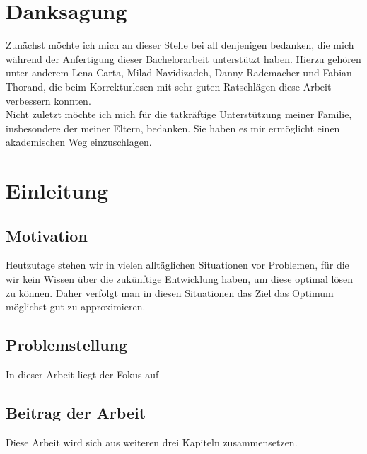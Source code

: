 \documentclass[12pt,twoside]{report}
\begin{document}
	
	\pagestyle{empty}
	\clearpage\mbox{}\clearpage
	\chapter*{Danksagung}
	Zunächst möchte ich mich an dieser Stelle bei all denjenigen bedanken, die mich während der Anfertigung dieser Bachelorarbeit unterstützt haben. Hierzu gehören unter anderem Lena Carta, Milad Navidizadeh, Danny Rademacher und Fabian Thorand, die beim Korrekturlesen mit sehr guten Ratschlägen diese Arbeit verbessern konnten.\\
	
	Nicht zuletzt möchte ich mich für die tatkräftige Unterstützung meiner Familie, insbesondere der meiner Eltern, bedanken. Sie haben es mir ermöglicht einen akademischen Weg einzuschlagen.
	
	\pagestyle{empty}
	\clearpage\mbox{}\clearpage	
	
	\tableofcontents
	
	\pagestyle{empty}
	\clearpage\mbox{}\clearpage
	
	\pagestyle{fancy} %
	\fancyhead[RE]{\nouppercase\leftmark}
	\fancyhead[LO]{\nouppercase\rightmark}
	\fancyhead[LE,RO]{\thepage}
	\cfoot{}
	
	\clearpage
	\chapter{Einleitung}\label{Chapter: Einleitung}
	
	\section{Motivation}
	Heutzutage stehen wir in vielen alltäglichen Situationen vor Problemen, für die wir kein Wissen über die zukünftige Entwicklung haben, um diese optimal lösen zu können. Daher verfolgt man in diesen Situationen das Ziel das Optimum möglichst gut zu approximieren. 

	
	
	\section{Problemstellung}\label{Section: Problemstellung}
	In dieser Arbeit liegt der Fokus auf 


	
	\section{Beitrag der Arbeit}
	Diese Arbeit wird sich aus weiteren drei Kapiteln zusammensetzen.	
	
\end{document}
